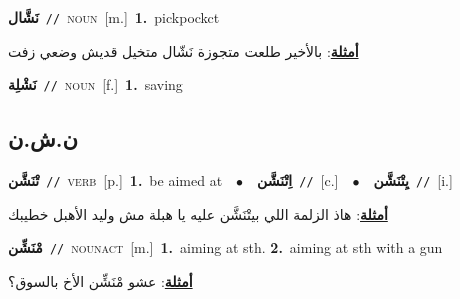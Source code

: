 \documentclass[10pt,a4paper,twoside]{article} %
\begin{document}
\begin{multicols}{2}
{\setlength\topsep{0pt}\textbf{\foreignlanguage{arabic}{نَشَّال}}\ {\color{gray}\texttt{//}\color{black}}\ \textsc{noun}\ [m.]\ \textbf{1.}~pickpockct\  \begin{flushright}\color{gray}\foreignlanguage{arabic}{\textbf{\underline{\foreignlanguage{arabic}{أمثلة}}}: بالأخير طلعت متجوزة نَشّال متخيل قديش وضعي زفت}\end{flushright}\color{black}} \vspace{2mm}

{\setlength\topsep{0pt}\textbf{\foreignlanguage{arabic}{نَشْلِة}}\ {\color{gray}\texttt{//}\color{black}}\ \textsc{noun}\ [f.]\ \textbf{1.}~saving\ } \vspace{2mm}

\vspace{-3mm}
\subsection*{\color{blue}\foreignlanguage{arabic}{ن.ش.ن}\color{blue}{}} 

{\setlength\topsep{0pt}\textbf{\foreignlanguage{arabic}{تْنَشَّن}}\ {\color{gray}\texttt{//}\color{black}}\ \textsc{verb}\ [p.]\ \textbf{1.}~be aimed at\ \ $\bullet$\ \ \setlength\topsep{0pt}\textbf{\foreignlanguage{arabic}{اِتْنَشَّن}}\ {\color{gray}\texttt{//}\color{black}}\ [c.]\ \ $\bullet$\ \ \setlength\topsep{0pt}\textbf{\foreignlanguage{arabic}{يِتْنَشَّن}}\ {\color{gray}\texttt{//}\color{black}}\ [i.]\  \begin{flushright}\color{gray}\foreignlanguage{arabic}{\textbf{\underline{\foreignlanguage{arabic}{أمثلة}}}: هاذ الزلمة اللي بيتْنَشَّن عليه يا هبلة مش وليد الأهبل خطيبك}\end{flushright}\color{black}} \vspace{2mm}

{\setlength\topsep{0pt}\textbf{\foreignlanguage{arabic}{مْنَشِّن}}\ {\color{gray}\texttt{//}\color{black}}\ \textsc{noun\textunderscore act}\ [m.]\ \textbf{1.}~aiming at sth.  \textbf{2.}~aiming at sth with a gun\  \begin{flushright}\color{gray}\foreignlanguage{arabic}{\textbf{\underline{\foreignlanguage{arabic}{أمثلة}}}: عشو مْنَشِّن الأخ بالسوق؟}\end{flushright}\color{black}} \vspace{2mm}


\end{multicols}
\end{document}
